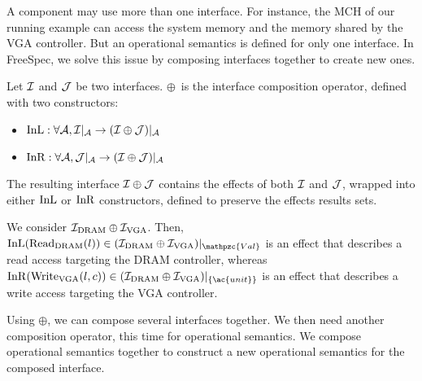 A component may use more than one interface.
%
For instance, the MCH of our running example can access the system memory and
the memory shared by the VGA controller.
%
But an operational semantics is defined for only one interface.
%
In FreeSpec, we solve this issue by composing interfaces together to create new
ones.

\begin{definition}
  Let $\mathcal{I}$ and $\mathcal{J}$ be two interfaces. $\oplus$~is the interface composition
  operator, defined with two constructors:
  \begin{itemize}
  \item
    $\mathrm{InL} : \forall \mathcal{A}, \mathcal{I}|_{\mathcal{A}} \rightarrow
    (\mathcal{I} \oplus \mathcal{J})|_{\mathcal{A}}$
  \item
    $\mathrm{InR} : \forall \mathcal{A}, \mathcal{J}|_{\mathcal{A}} \rightarrow
    (\mathcal{I} \oplus \mathcal{J})|_{\mathcal{A}}$
  \end{itemize}
\end{definition}

The resulting interface $\mathcal{I} \oplus \mathcal{J}$ contains the effects of both $\mathcal{I}$ and
$\mathcal{J}$, wrapped into either $\mathrm{InL}$ or $\mathrm{InR}$ constructors, defined to
preserve the effects results sets.
%

\begin{example}
  We consider $\mathcal{I}_{\mathrm{DRAM}} \oplus \mathcal{I}_{\mathrm{VGA}}$. Then,
  $\func{InL}(\func{Read}_{\mathrm{DRAM}}(l)) \in \Interface{(\I_{\mathrm{DRAM}}
    \oplus \I_{\mathrm{VGA}})}{\mathpzc{Val}}$ is an effect that describes a
  read access targeting the DRAM controller, whereas
  $\func{InR}(\func{Write}_{\mathrm{VGA}}(l, c)) \in
  \Interface{(\I_{\mathrm{DRAM}} \oplus \I_{\mathrm{VGA}})}{\{\ac{unit}\}}$ is
  an effect that describes a write access targeting the VGA controller.
\end{example}

Using $\oplus$, we can compose several interfaces together.
%
We then need another composition operator, this time for operational semantics.
%
We compose operational semantics together to construct a new operational
semantics for the composed interface.

